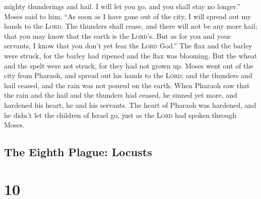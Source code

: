 mighty thunderings and hail. I will let you go, and you shall stay no
longer.''  Moses said to him, ``As soon as I have gone
out of the city, I will spread out my hands to the \textsc{Lord}. The
thunders shall cease, and there will not be any more hail; that you may
know that the earth is the \textsc{Lord}'s.  But as for
you and your servants, I know that you don't yet fear the \textsc{Lord}
God.''  The flax and the barley were struck, for the
barley had ripened and the flax was blooming.  But the
wheat and the spelt were not struck, for they had not grown up.
 Moses went out of the city from Pharaoh, and spread out
his hands to the \textsc{Lord}; and the thunders and hail ceased, and
the rain was not poured on the earth.  When Pharaoh saw
that the rain and the hail and the thunders had ceased, he sinned yet
more, and hardened his heart, he and his servants.  The
heart of Pharaoh was hardened, and he didn't let the children of Israel
go, just as the \textsc{Lord} had spoken through Moses.

\hypertarget{the-eighth-plague-locusts}{%
\subsection{The Eighth Plague:
Locusts}\label{the-eighth-plague-locusts}}

\hypertarget{section-9}{%
\section{10}\label{section-9}}

